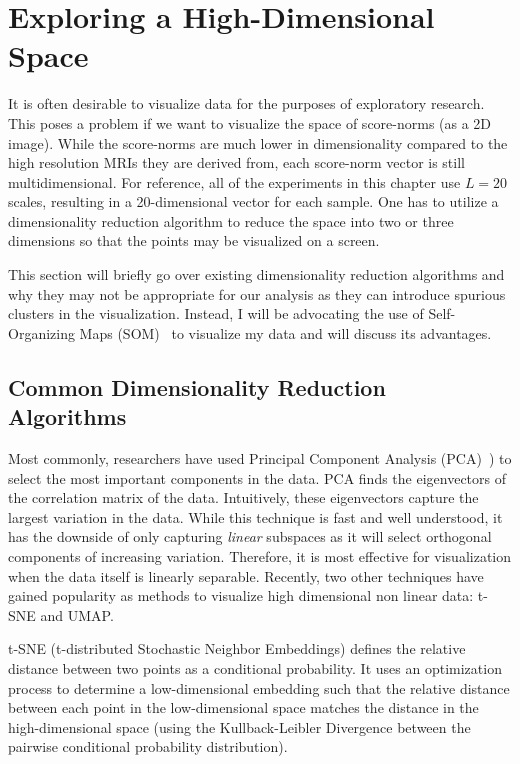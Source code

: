 \section{Exploring a High-Dimensional Space}

It is often desirable to visualize data for the purposes of exploratory research. This poses a problem if we want to visualize the space of score-norms (as a 2D image). While the score-norms are much lower in dimensionality compared to the high resolution MRIs they are derived from, each score-norm vector is still multidimensional. For reference, all of the experiments in this chapter use $L=20$ scales, resulting in a 20-dimensional vector for each sample. One has to utilize a dimensionality reduction algorithm to reduce the space into two or three dimensions so that the points may be visualized on a screen.

This section will briefly go over existing dimensionality reduction algorithms and why they may not be appropriate for our analysis as they can introduce spurious clusters in the visualization. Instead, I will be advocating the use of Self-Organizing Maps (SOM)~\cite{kohonen1990self}  to visualize my data and will discuss its advantages.


\subsection*{Common Dimensionality Reduction Algorithms}

Most commonly, researchers have used Principal Component Analysis (PCA)~\cite{abdi2010principal}) to select the most important components in the data. PCA finds the eigenvectors of the correlation matrix of the data. Intuitively, these eigenvectors capture the largest variation in the data. While this technique is fast and well understood, it has the downside of only capturing \textit{linear} subspaces as it will select orthogonal components of increasing variation. Therefore, it is most effective for visualization when the data itself is linearly separable. Recently, two other techniques have gained popularity as methods to visualize high dimensional non linear data: t-SNE and UMAP.  


t-SNE (t-distributed Stochastic Neighbor Embeddings) defines the relative distance between two points as a conditional probability. It uses an optimization process to determine a low-dimensional embedding such that the relative distance between each point in the low-dimensional space matches the distance in the high-dimensional space (using the Kullback-Leibler Divergence between the pairwise conditional probability distribution).

